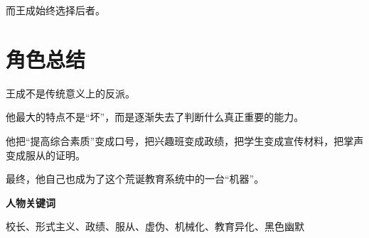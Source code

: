 \documentclass[12pt,a4paper]{ctexart}
\begin{document}
	而王成始终选择后者。
	
	\section{角色总结}
	
	王成不是传统意义上的反派。
	
	他最大的特点不是“坏”，而是逐渐失去了判断什么真正重要的能力。
	
	他把“提高综合素质”变成口号，把兴趣班变成政绩，把学生变成宣传材料，把掌声变成服从的证明。
	
	最终，他自己也成为了这个荒诞教育系统中的一台“机器”。
	
	\vspace{1em}
	
	\begin{center}
		\textbf{人物关键词}
		
		\vspace{0.5em}
		
		校长、形式主义、政绩、服从、虚伪、机械化、教育异化、黑色幽默
	\end{center}
	
\end{document}
